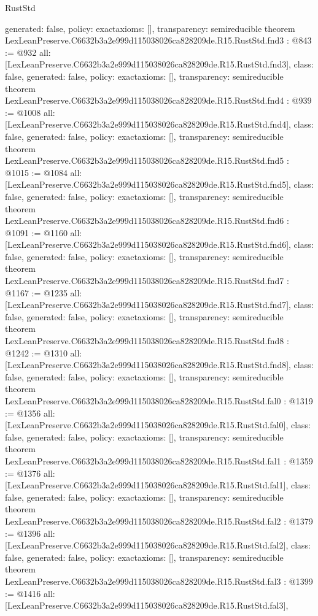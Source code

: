 \begin{lexlean}{RustStd}
\begin{coremodule}
{  generated: false,
  policy: exact{axioms: []},
  transparency: semireducible
}
theorem LexLeanPreserve.C6632b3a2e999d115038026ca828209de.R15.RustStd.fnd3 : @843 := @932 {
  all: [LexLeanPreserve.C6632b3a2e999d115038026ca828209de.R15.RustStd.fnd3],
  class: false,
  generated: false,
  policy: exact{axioms: []},
  transparency: semireducible
}
theorem LexLeanPreserve.C6632b3a2e999d115038026ca828209de.R15.RustStd.fnd4 : @939 := @1008 {
  all: [LexLeanPreserve.C6632b3a2e999d115038026ca828209de.R15.RustStd.fnd4],
  class: false,
  generated: false,
  policy: exact{axioms: []},
  transparency: semireducible
}
theorem LexLeanPreserve.C6632b3a2e999d115038026ca828209de.R15.RustStd.fnd5 : @1015 := @1084 {
  all: [LexLeanPreserve.C6632b3a2e999d115038026ca828209de.R15.RustStd.fnd5],
  class: false,
  generated: false,
  policy: exact{axioms: []},
  transparency: semireducible
}
theorem LexLeanPreserve.C6632b3a2e999d115038026ca828209de.R15.RustStd.fnd6 : @1091 := @1160 {
  all: [LexLeanPreserve.C6632b3a2e999d115038026ca828209de.R15.RustStd.fnd6],
  class: false,
  generated: false,
  policy: exact{axioms: []},
  transparency: semireducible
}
theorem LexLeanPreserve.C6632b3a2e999d115038026ca828209de.R15.RustStd.fnd7 : @1167 := @1235 {
  all: [LexLeanPreserve.C6632b3a2e999d115038026ca828209de.R15.RustStd.fnd7],
  class: false,
  generated: false,
  policy: exact{axioms: []},
  transparency: semireducible
}
theorem LexLeanPreserve.C6632b3a2e999d115038026ca828209de.R15.RustStd.fnd8 : @1242 := @1310 {
  all: [LexLeanPreserve.C6632b3a2e999d115038026ca828209de.R15.RustStd.fnd8],
  class: false,
  generated: false,
  policy: exact{axioms: []},
  transparency: semireducible
}
theorem LexLeanPreserve.C6632b3a2e999d115038026ca828209de.R15.RustStd.fal0 : @1319 := @1356 {
  all: [LexLeanPreserve.C6632b3a2e999d115038026ca828209de.R15.RustStd.fal0],
  class: false,
  generated: false,
  policy: exact{axioms: []},
  transparency: semireducible
}
theorem LexLeanPreserve.C6632b3a2e999d115038026ca828209de.R15.RustStd.fal1 : @1359 := @1376 {
  all: [LexLeanPreserve.C6632b3a2e999d115038026ca828209de.R15.RustStd.fal1],
  class: false,
  generated: false,
  policy: exact{axioms: []},
  transparency: semireducible
}
theorem LexLeanPreserve.C6632b3a2e999d115038026ca828209de.R15.RustStd.fal2 : @1379 := @1396 {
  all: [LexLeanPreserve.C6632b3a2e999d115038026ca828209de.R15.RustStd.fal2],
  class: false,
  generated: false,
  policy: exact{axioms: []},
  transparency: semireducible
}
theorem LexLeanPreserve.C6632b3a2e999d115038026ca828209de.R15.RustStd.fal3 : @1399 := @1416 {
  all: [LexLeanPreserve.C6632b3a2e999d115038026ca828209de.R15.RustStd.fal3],
}
\end{coremodule}
\end{lexlean}
